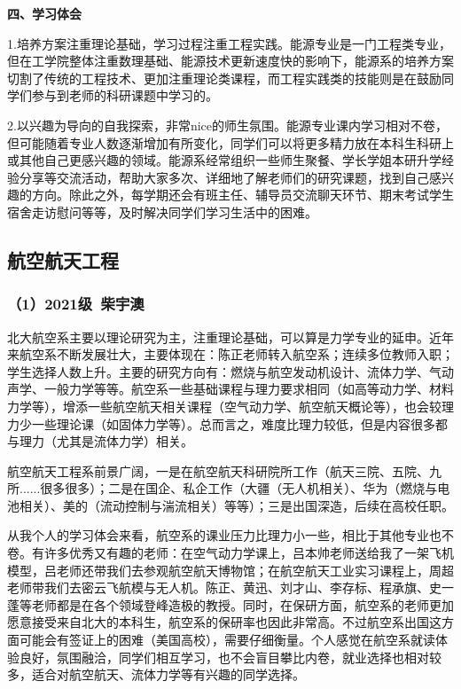 \documentclass[11pt,oneside]{book}
\begin{document}
\textbf{四、学习体会}

1.培养方案注重理论基础，学习过程注重工程实践。能源专业是一门工程类专业，但在工学院整体注重数理基础、能源技术更新速度快的影响下，能源系的培养方案切割了传统的工程技术、更加注重理论类课程，而工程实践类的技能则是在鼓励同学们参与到老师的科研课题中学习的。

2.以兴趣为导向的自我探索，非常nice的师生氛围。能源专业课内学习相对不卷，但可能随着专业人数逐渐增加有所变化，同学们可以将更多精力放在本科生科研上或其他自己更感兴趣的领域。能源系经常组织一些师生聚餐、学长学姐本研升学经验分享等交流活动，帮助大家多次、详细地了解老师们的研究课题，找到自己感兴趣的方向。除此之外，每学期还会有班主任、辅导员交流聊天环节、期末考试学生宿舍走访慰问等等，及时解决同学们学习生活中的困难。


\subsection{航空航天工程}
\subsubsection{（1）2021级\ 柴宇澳}

北大航空系主要以理论研究为主，注重理论基础，可以算是力学专业的延申。近年来航空系不断发展壮大，主要体现在：陈正老师转入航空系；连续多位教师入职；学生选择人数上升。主要的研究方向有：燃烧与航空发动机设计、流体力学、气动声学、一般力学等等。航空系一些基础课程与理力要求相同（如高等动力学、材料力学等），增添一些航空航天相关课程（空气动力学、航空航天概论等），也会较理力少一些理论课（如固体力学等）。总而言之，难度比理力较低，但是内容很多都与理力（尤其是流体力学）相关。

航空航天工程系前景广阔，一是在航空航天科研院所工作（航天三院、五院、九所......很多很多）；二是在国企、私企工作（大疆（无人机相关）、华为（燃烧与电池相关）、美的（流动控制与湍流相关）等等）；三是出国深造，后续在高校任职。

从我个人的学习体会来看，航空系的课业压力比理力小一些，相比于其他专业也不卷。有许多优秀又有趣的老师：在空气动力学课上，吕本帅老师送给我了一架飞机模型，吕老师还带我们去参观航空航天博物馆；在航空航天工业实习课程上，周超老师带我们去密云飞航模与无人机。陈正、黄迅、刘才山、李存标、程承旗、史一蓬等老师都是在各个领域登峰造极的教授。同时，在保研方面，航空系的老师更加愿意接受来自北大的本科生，航空系的保研率也因此非常高。不过航空系出国这方面可能会有签证上的困难（美国高校），需要仔细衡量。个人感觉在航空系就读体验良好，氛围融洽，同学们相互学习，也不会盲目攀比内卷，就业选择也相对较多，适合对航空航天、流体力学等有兴趣的同学选择。
\end{document}
